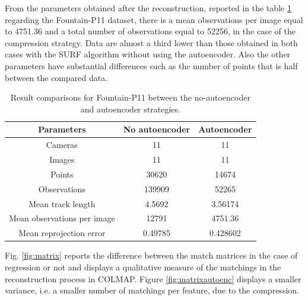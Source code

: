 From the parameters obtained after the reconstruction, reported in the table \ref{table:result} regarding the Fountain-P11 dataset, there is a mean observations per image equal to 4751.36 and a total number of observations equal to 52256, in the case of the compression strategy. Data are almost a third lower than those obtained in both cases with the SURF algorithm without using the autoencoder. Also the other parameters have substantial differences such as the number of points that is half between the compared data.

\begin{table}[h!]
\centering
\begin{tabular}{ |c|c|c| } 
\hline
\textbf{Parameters} & \textbf{No autoencoder} & \textbf{Autoencoder} \\ [0.5ex]
\hline
 Cameras & 11 & 11 \\ [0.5ex]
 Images & 11 & 11 \\ [0.5ex]
 Points & 30620 & 14674 \\ [0.5ex]
 Observations & 139909 & 52265 \\ [0.5ex]
 Mean track length & 4.5692 & 3.56174 \\ [0.5ex]
 Mean observations per image & 12791 & 4751.36 \\ [0.5ex]
 Mean reprojection error & 0.49785 & 0.428602 \\ [0.5ex]
 \hline
\end{tabular}
 \caption{\centering Result comparisons for Fountain-P11 between the no-autoencoder and autoencoder strategies.}
 \label{table:result}
\end{table}

Fig. \ref{fig:matrix} reports the difference between the match matrices in the case of regression or not and displays a qualitative measure of the matchings in the reconstruction process in COLMAP. Figure \ref{fig:matrixautoenc} displays a smaller variance, i.e. a smaller number of matchings per feature, due to the compression.

